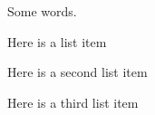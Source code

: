 \documentclass{article}
\newenvironment{sample}{
	\begin{list}{}{}
	\setlength{\labelwidth}{20mm}
}{ 
	\end{list}
}
\begin{document}
	Some words.
\begin{sample}
	\item Here is a list item
	\item Here is a second list item
	\item Here is a third list item
\end{sample}
\end{document}
